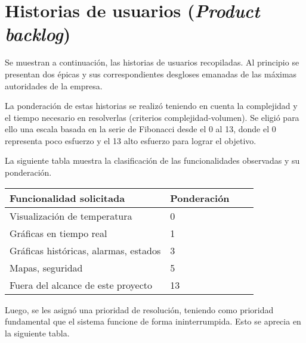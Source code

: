 \documentclass[11pt]{proyecto}
\begin{document}
\section{Historias de usuarios (\textit{Product backlog})}
\label{sec:backlog}


Se muestran a continuación, las historias de usuarios recopiladas. Al principio se presentan dos épicas y sus correspondientes desgloses emanadas de las máximas autoridades de la empresa.

La ponderación de estas historias se realizó teniendo en cuenta la complejidad y el tiempo necesario en resolverlas (criterios complejidad-volumen). Se eligió para ello una escala basada en la serie de Fibonacci desde el 0 al 13, donde el 0 representa poco esfuerzo y el 13 alto esfuerzo para lograr el objetivo. 

La siguiente tabla muestra la clasificación de las funcionalidades observadas y su ponderación.


\begin{table}[ht]
\begin{tabularx}{\linewidth}{@{}|l|X|X|l|@{}}
\hline
\rowcolor[HTML]{C0C0C0} 
Funcionalidad solicitada           & Ponderación 	\\ \hline

Visualización de temperatura & 0\\ \hline
Gráficas en tiempo real & 1\\ \hline
Gráficas históricas, alarmas, estados & 3\\ \hline
Mapas, seguridad & 5\\ \hline
Fuera del alcance de este proyecto & 13\\ \hline

\end{tabularx}
\end{table}
Luego, se les asignó una prioridad de resolución, teniendo como prioridad fundamental que el sistema funcione de forma ininterrumpida. Esto se aprecia en la siguiente tabla.
\end{document}
